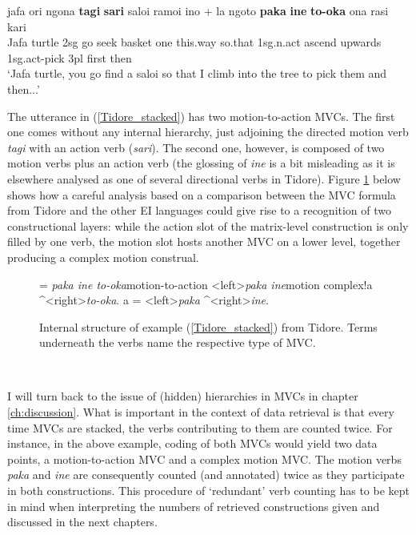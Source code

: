 \ea \label{Tidore_stacked}
\gll jafa ori ngona \textbf{tagi} \textbf{sari} saloi ramoi ino + la ngoto \textbf{paka} \textbf{ine} \textbf{to-oka} ona rasi kari \\
Jafa turtle 2\acs{sg} go seek basket one this.way so.that 1\acs{sg}.\acs{n}.\acs{act} ascend upwards 1\acs{sg}.\acs{act}-pick 3\acs{pl} first then \\
\glft `Jafa turtle, you go find a saloi so that I climb into the tree to pick them and then...' \\ 
\z
\xe

The utterance in (\ref{Tidore_stacked}) has two motion-to-action MVCs. The first one comes without any internal hierarchy, just adjoining the directed motion verb \textit{tagi} with an action verb (\textit{sari}). The second one, however, is composed of two motion verbs plus an action verb (the glossing of \textit{ine} is a bit misleading as it is elsewhere analysed as one of several directional verbs in Tidore). Figure \ref{figure:tidoreMVC} below shows how a careful analysis based on a comparison between the MVC formula from Tidore and the other EI languages could give rise to a recognition of two constructional layers: while the action slot of the matrix-level construction is only filled by one verb, the motion slot hosts another MVC on a lower level, together producing a complex motion construal.  

\begin{figure}[h]


\jtree[xunit=8em]
\! = {\textit{paka ine to-oka}}{motion-to-action}
<left>{\textit{paka ine}}{motion complex}!a ^<right>{\textit{to-oka}}.
\!a = <left>{\textit{paka}} ^<right>{\textit{ine}}.
\endjtree


\caption[Internal structure of example (\ref{Tidore_stacked}) from Tidore]{Internal structure of example (\ref{Tidore_stacked}) from Tidore. Terms underneath the verbs name the respective type of MVC.}
\label{figure:tidoreMVC}
\end{figure}
\

I will turn back to the issue of (hidden) hierarchies in MVCs in chapter \ref{ch:discussion}. What is important in the context of data retrieval is that every time MVCs are stacked, the verbs contributing to them are counted twice. For instance, in the above example, coding of both MVCs would yield two data points, a motion-to-action MVC and a complex motion MVC. The motion verbs \textit{paka} and \textit{ine} are consequently counted (and annotated) twice as they participate in both constructions. This procedure of `redundant' verb counting has to be kept in mind when interpreting the numbers of retrieved constructions given and discussed in the next chapters.

